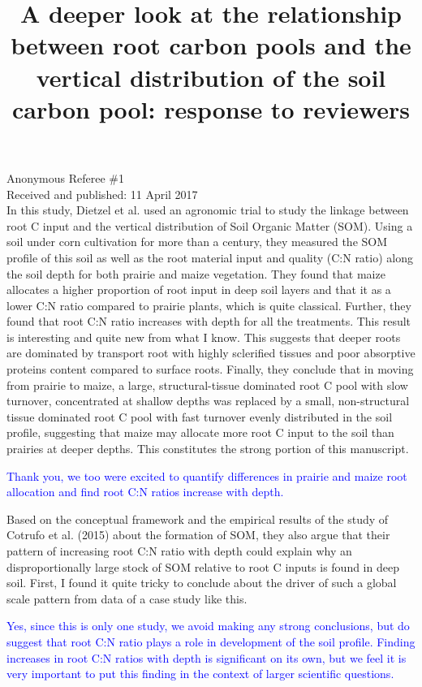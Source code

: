 \documentclass[]{article}
\title{A deeper look at the relationship between root carbon pools and the
vertical distribution of the soil carbon pool: response to reviewers}
\author{}
\date{}
\begin{document}
\maketitle

Anonymous Referee \#1\\
Received and published: 11 April 2017\\
In this study, Dietzel et al. used an agronomic trial to study the
linkage between root C input and the vertical distribution of Soil
Organic Matter (SOM). Using a soil under corn cultivation for more than
a century, they measured the SOM profile of this soil as well as the
root material input and quality (C:N ratio) along the soil depth for
both prairie and maize vegetation. They found that maize allocates a
higher proportion of root input in deep soil layers and that it as a
lower C:N ratio compared to prairie plants, which is quite classical.
Further, they found that root C:N ratio increases with depth for all the
treatments. This result is interesting and quite new from what I know.
This suggests that deeper roots are dominated by transport root with
highly sclerified tissues and poor absorptive proteins content compared
to surface roots. Finally, they conclude that in moving from prairie to
maize, a large, structural-tissue dominated root C pool with slow
turnover, concentrated at shallow depths was replaced by a small,
non-structural tissue dominated root C pool with fast turnover evenly
distributed in the soil profile, suggesting that maize may allocate more
root C input to the soil than prairies at deeper depths. This
constitutes the strong portion of this manuscript.

\textcolor{blue}{Thank you, we too were excited to quantify differences in prairie and maize root allocation and find root C:N ratios increase with depth.}

Based on the conceptual framework and the empirical results of the study
of Cotrufo et al. (2015) about the formation of SOM, they also argue
that their pattern of increasing root C:N ratio with depth could explain
why an disproportionally large stock of SOM relative to root C inputs is
found in deep soil. First, I found it quite tricky to conclude about the
driver of such a global scale pattern from data of a case study like
this.

\textcolor{blue}{Yes, since this is only one study, we avoid making any strong conclusions, but do suggest that root C:N ratio plays a role in development of the soil profile. Finding increases in root C:N ratios with depth is significant on its own, but we feel it is very important to put this finding in the context of larger scientific questions.}
\end{document}
